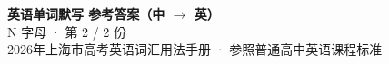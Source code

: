 \documentclass[10pt,a4paper]{article}
\begin{document}
\pagestyle{plain}

\begin{center}
{\LARGE\bfseries 英语单词默写 \quad 参考答案（中 $\to$ 英）}\\[0.22em]
{\large N 字母 · 第 2 / 2 份}\\[0.18em]
{\small 2026年上海市高考英语词汇用法手册 · 参照普通高中英语课程标准}
\end{center}

\vspace{0.2em}
\noindent{\color{rulegray}\rule{\textwidth}{0.8pt}}

\vspace{0.35em}

\vspace{0.25em}
\renewcommand{\arraystretch}{1.32}
\end{document}
